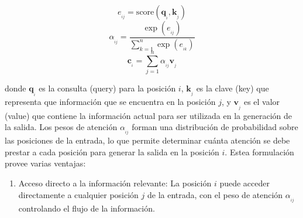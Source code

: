 \begin{equation}
    e_{_{ij}} = \text{score}(\pmb{q}_{_i}, \pmb{k}_{_j})
\end{equation}
\begin{equation}
    \alpha_{_{ij}} = \frac{\exp(e_{_{ij}})}{\sum_{k=1}^{n} \exp(e_{_{ik}})}
\end{equation}
\begin{equation}
    \pmb{c}_{_i} = \sum_{j=1}^{n} \alpha_{_{ij}} \pmb{v}_{_j}
\end{equation}

donde \(\pmb{q}_{_i}\) es la consulta (query) para la posición \(i\), \(\pmb{k}_{_j}\) es la clave (key) que representa
que información que se encuentra en la posición \(j\), y \(\pmb{v}_{_j}\) es el valor (value) que contiene la
información actual para ser utilizada en la generación de la salida. Los pesos de atención \(\alpha_{_{ij}}\) forman
una distribución de probabilidad sobre las posiciones de la entrada, lo que permite determinar cuánta atención se debe
prestar a cada posición para generar la salida en la posición \(i\). Estea formulación provee varias ventajas:

\begin{enumerate}
    \item{Acceso directo a la información relevante:} La posición \(i\) puede acceder directamente a cualquier posición \(j\) de la entrada, con el peso de atención \(\alpha_{_{ij}}\) controlando el flujo de la información.
\end{enumerate}